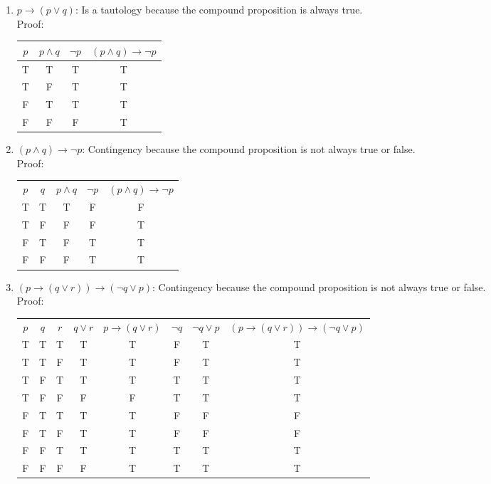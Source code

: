 \documentclass[11pt]{article}
\begin{document}
\begin{enumerate}
\begin{enumerate}[label=(\alph*)]
\item
$p \rightarrow (p \vee q)$: Is a tautology because the compound proposition is always true. \\
Proof: \\
\begin{tabular}{|c|c|c|c|} \hline
$p$ & $p \wedge q$ & $\lnot p$ & $(p \wedge q) \rightarrow \lnot p$ \\
\hline
T&T&T&T \\
\hline
T&F&T&T \\
\hline
F&T&T&T \\ 
\hline
F&F&F&T \\
\hline
\end{tabular}
\item 
$(p \wedge q) \rightarrow \lnot p$: Contingency because the compound proposition is not always true or false. \\
Proof: \\
\begin{tabular}{|c|c|c|c|c|} \hline
$p$ & $q$ & $p \wedge q$ & $\lnot p$ & $(p \wedge q) \rightarrow \lnot p$ \\
T&T&T&F&F \\
\hline
T&F&F&F&T \\
\hline
F&T&F&T&T \\
\hline
F&F&F&T&T \\
\hline
\end{tabular}
\item 
$(p \rightarrow (q \vee r)) \rightarrow (\lnot q \vee p)$: Contingency because the compound proposition is not always true or false. \\
Proof: \\
\begin{tabular}{|c|c|c|c|c|c|c|c|} \hline
$p$ & $q$ & $r$ & $q \vee r$ & $p \rightarrow (q \vee r)$ & $ \lnot q$ & $\lnot q \vee p$ & $(p \rightarrow (q\vee r)) \rightarrow (\lnot q \vee p)$ \\
T&T&T&T&T&F&T&T \\
\hline
T&T&F&T&T&F&T&T \\ 
\hline
T&F&T&T&T&T&T&T \\
\hline
T&F&F&F&F&T&T&T \\
\hline
F&T&T&T&T&F&F&F \\
\hline
F&T&F&T&T&F&F&F \\ 
\hline
F&F&T&T&T&T&T&T \\
\hline
F&F&F&F&T&T&T&T \\
\hline
\end{tabular}

\end{enumerate}
\end{enumerate}
\end{document}
